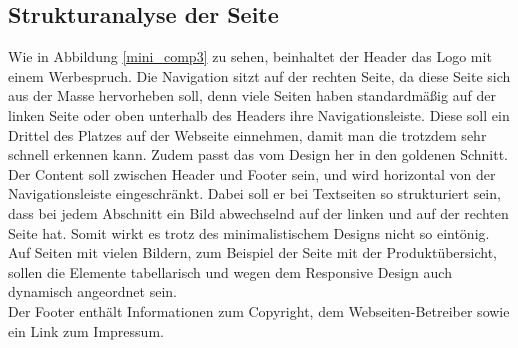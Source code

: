 	\subsection{Strukturanalyse der Seite}
Wie in Abbildung \ref{mini_comp3} zu sehen, beinhaltet der Header das Logo mit einem Werbespruch.
Die Navigation sitzt auf der rechten Seite, da diese Seite sich aus der Masse hervorheben soll, denn viele Seiten haben standardmäßig auf der linken Seite oder oben unterhalb des Headers ihre Navigationsleiste. Diese soll ein Drittel des Platzes auf der Webseite einnehmen, damit man die trotzdem sehr schnell erkennen kann. Zudem passt das vom Design her in den goldenen Schnitt. 
\\
Der Content soll zwischen Header und Footer sein, und wird horizontal von der Navigationsleiste eingeschränkt. Dabei soll er bei Textseiten so strukturiert sein, dass bei jedem Abschnitt ein Bild abwechselnd auf der linken und auf der rechten Seite hat. Somit wirkt es trotz des minimalistischem Designs nicht so eintönig. Auf Seiten mit vielen Bildern, zum Beispiel der Seite mit der Produktübersicht, sollen die Elemente tabellarisch und wegen dem Responsive Design auch dynamisch angeordnet sein.
\\
Der Footer enthält Informationen zum Copyright, dem Webseiten-Betreiber sowie ein Link zum Impressum.
